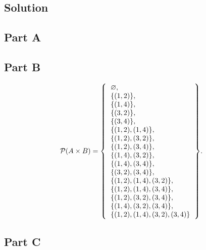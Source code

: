 \documentclass[12pt]{extarticle}
\newcommand{\powerset}[1]{\mathcal{P}(#1)}
\begin{document}
\subsection*{Solution}
\begin{multicols}{2}
\subsection*{Part A}


\columnbreak
\subsection*{Part B}
\[
	\newcolumntype{L}{>{$}l<{$}}
	\powerset{A \times B} = \qty{
	\begin{tabular}{L}
		\varnothing, \\
		\qty{(1, 2)}, \\
 		\qty{(1, 4)}, \\
 		\qty{(3, 2)}, \\
 		\qty{(3, 4)}, \\
		\qty{(1, 2), (1, 4)}, \\
 		\qty{(1, 2), (3, 2)}, \\
 		\qty{(1, 2), (3, 4)}, \\
 		\qty{(1, 4), (3, 2)}, \\
 		\qty{(1, 4), (3, 4)}, \\
 		\qty{(3, 2), (3, 4)}, \\
		\qty{(1, 2), (1, 4), (3, 2)}, \\
 		\qty{(1, 2), (1, 4), (3, 4)}, \\
 		\qty{(1, 2), (3, 2), (3, 4)}, \\
 		\qty{(1, 4), (3, 2), (3, 4)}, \\
		\qty{(1, 2), (1, 4), (3, 2), (3, 4)} \\
	\end{tabular}
}
.\]
\end{multicols}

\subsection*{Part C}
\end{document}
